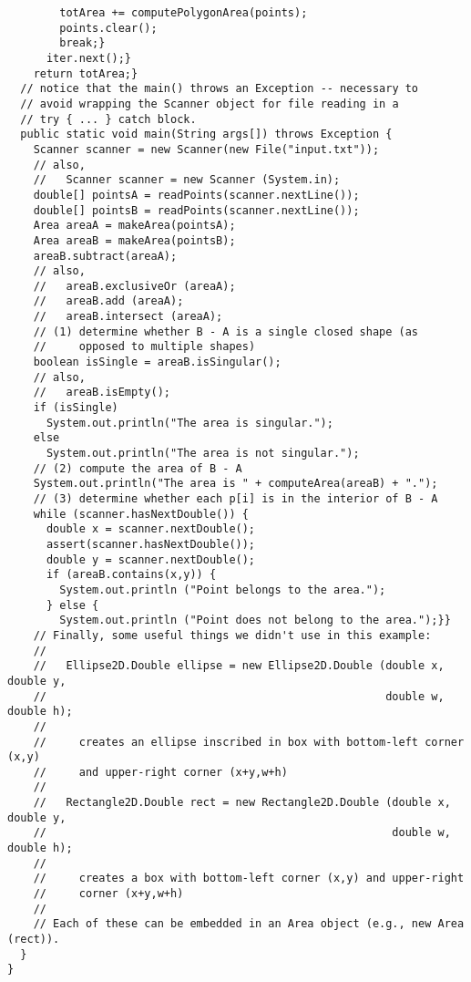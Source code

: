 \documentclass[8pt, oneside]{extarticle}
\begin{document}
\begin{multicols}{3}
\begin{lstlisting}
        totArea += computePolygonArea(points);
        points.clear();
        break;}
      iter.next();}
    return totArea;}
  // notice that the main() throws an Exception -- necessary to
  // avoid wrapping the Scanner object for file reading in a 
  // try { ... } catch block.
  public static void main(String args[]) throws Exception {
    Scanner scanner = new Scanner(new File("input.txt"));
    // also,
    //   Scanner scanner = new Scanner (System.in);
    double[] pointsA = readPoints(scanner.nextLine());
    double[] pointsB = readPoints(scanner.nextLine());
    Area areaA = makeArea(pointsA);
    Area areaB = makeArea(pointsB);
    areaB.subtract(areaA);
    // also,
    //   areaB.exclusiveOr (areaA);
    //   areaB.add (areaA);
    //   areaB.intersect (areaA);
    // (1) determine whether B - A is a single closed shape (as 
    //     opposed to multiple shapes)
    boolean isSingle = areaB.isSingular();
    // also,
    //   areaB.isEmpty();
    if (isSingle)
      System.out.println("The area is singular.");
    else
      System.out.println("The area is not singular.");
    // (2) compute the area of B - A
    System.out.println("The area is " + computeArea(areaB) + ".");
    // (3) determine whether each p[i] is in the interior of B - A
    while (scanner.hasNextDouble()) {
      double x = scanner.nextDouble();
      assert(scanner.hasNextDouble());
      double y = scanner.nextDouble();
      if (areaB.contains(x,y)) {
        System.out.println ("Point belongs to the area.");
      } else {
        System.out.println ("Point does not belong to the area.");}}
    // Finally, some useful things we didn't use in this example:
    //
    //   Ellipse2D.Double ellipse = new Ellipse2D.Double (double x, double y, 
    //                                                    double w, double h);
    //
    //     creates an ellipse inscribed in box with bottom-left corner (x,y)
    //     and upper-right corner (x+y,w+h)
    // 
    //   Rectangle2D.Double rect = new Rectangle2D.Double (double x, double y, 
    //                                                     double w, double h);
    //
    //     creates a box with bottom-left corner (x,y) and upper-right 
    //     corner (x+y,w+h)
    //
    // Each of these can be embedded in an Area object (e.g., new Area (rect)).
  }
}
\end{lstlisting}

\end{multicols}
\end{document}
